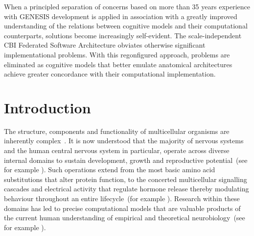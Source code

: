 \documentclass[10pt,letterpaper]{article}
\begin{document}
When a principled separation of concerns based on more than 35 years experience with GENESIS development is applied in association with a greatly improved understanding of the relations between cognitive models and their computational counterparts, solutions become increasingly self-evident. The scale-independent CBI Federated Software Architecture obviates otherwise significant implementational problems. With this regonfigured approach, problems are eliminated as cognitive models that better emulate anatomical architectures achieve greater concordance with their computational implementation.


\linenumbers


\section*{Introduction}

The structure, components and functionality of multicellular organisms are inherently complex~\cite{walpole13}. It is now understood that the majority of nervous systems and the human central nervous system in particular, operate across diverse internal domains to sustain development, growth and reproductive potential~(see for example \cite{selverston87,vonk22,kandel21}). Such operations extend from the most basic amino acid substitutions that alter protein function, to the concerted multicellular signalling cascades and electrical activity that regulate hormone release thereby modulating behaviour throughout an entire lifecycle~(for example \cite{ejn17}). Research within these domains has led to precise computational models that are valuable products of the current human understanding of empirical and theoretical neurobiology~(see for example \cite{bower13,nandi22}). 
\end{document}
